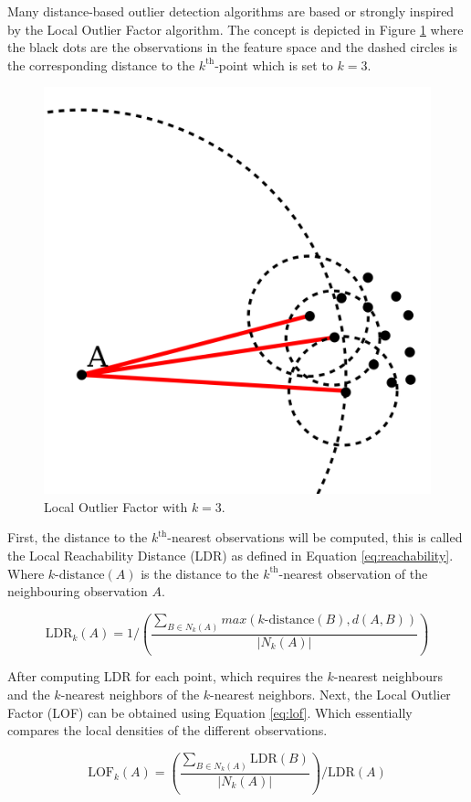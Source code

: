 Many distance-based outlier detection algorithms are based or strongly inspired by the Local Outlier Factor algorithm. The concept is depicted in Figure \ref{fig:lof} where the black dots are the observations in the feature space and the dashed circles is the corresponding distance to the $k^{\text{th}}$-point which is set to $k=3$.

\begin{figure}[ht!]
\centering
\includegraphics[width=.6\textwidth]{figures/lof.png}
\caption{Local Outlier Factor with $k=3$. \label{fig:lof}}
\end{figure}

First, the distance to the $k^{\text{th}}$-nearest observations will be computed, this is called the Local Reachability Distance (LDR) as defined in Equation \ref{eq:reachability}. Where $k\text{-distance}(A)$ is the distance to the $k^{\text{th}}$-nearest observation of the neighbouring observation $A$. 

\begin{equation}
\text{LDR}_{k}(A) = 1 / \left( \frac{\sum_{B \in N_{k}(A)} max(k\text{-distance}(B), d(A,B))}{|N_{k}(A)|} \right) \label{eq:reachability}
\end{equation}

After computing LDR for each point, which requires the $k$-nearest neighbours and the $k$-nearest neighbors of the $k$-nearest neighbors. Next, the Local Outlier Factor (LOF) can be obtained using Equation \ref{eq:lof}. Which essentially compares the local densities of the different observations.

\begin{equation}
\text{LOF}_{k}(A) = \left( \frac{\sum_{B \in N_{k}(A)} \text{LDR}(B)}{|N_{k}(A)|} \right) / \text{LDR}(A)
\label{eq:lof}
\end{equation}

